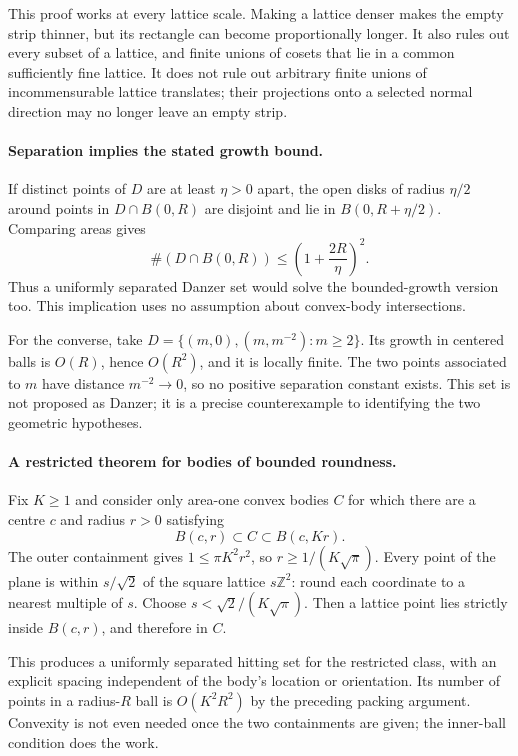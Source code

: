\documentclass[11pt,a4paper]{article}
\begin{document}
This proof works at every lattice scale. Making a lattice denser makes the empty strip thinner, but its rectangle can become proportionally longer. It also rules out every subset of a lattice, and finite unions of cosets that lie in a common sufficiently fine lattice. It does not rule out arbitrary finite unions of incommensurable lattice translates; their projections onto a selected normal direction may no longer leave an empty strip.

\paragraph{Separation implies the stated growth bound.}
If distinct points of $D$ are at least $\eta>0$ apart, the open disks of radius $\eta/2$ around points in $D\cap B(0,R)$ are disjoint and lie in $B(0,R+\eta/2)$. Comparing areas gives
\[
\#(D\cap B(0,R))\le\left(1+\frac{2R}{\eta}\right)^2.
\]
Thus a uniformly separated Danzer set would solve the bounded-growth version too. This implication uses no assumption about convex-body intersections.

For the converse, take $D=\{(m,0),(m,m^{-2}):m\ge2\}$. Its growth in centered balls is $O(R)$, hence $O(R^2)$, and it is locally finite. The two points associated to $m$ have distance $m^{-2}\to0$, so no positive separation constant exists. This set is not proposed as Danzer; it is a precise counterexample to identifying the two geometric hypotheses.

\paragraph{A restricted theorem for bodies of bounded roundness.}
Fix $K\ge1$ and consider only area-one convex bodies $C$ for which there are a centre $c$ and radius $r>0$ satisfying
\[
B(c,r)\subset C\subset B(c,Kr).
\]
The outer containment gives $1\le\pi K^2r^2$, so $r\ge1/(K\sqrt\pi)$. Every point of the plane is within $s/\sqrt2$ of the square lattice $s\mathbb Z^2$: round each coordinate to a nearest multiple of $s$. Choose $s<\sqrt2/(K\sqrt\pi)$. Then a lattice point lies strictly inside $B(c,r)$, and therefore in $C$.

This produces a uniformly separated hitting set for the restricted class, with an explicit spacing independent of the body's location or orientation. Its number of points in a radius-$R$ ball is $O(K^2R^2)$ by the preceding packing argument. Convexity is not even needed once the two containments are given; the inner-ball condition does the work.
\end{document}
